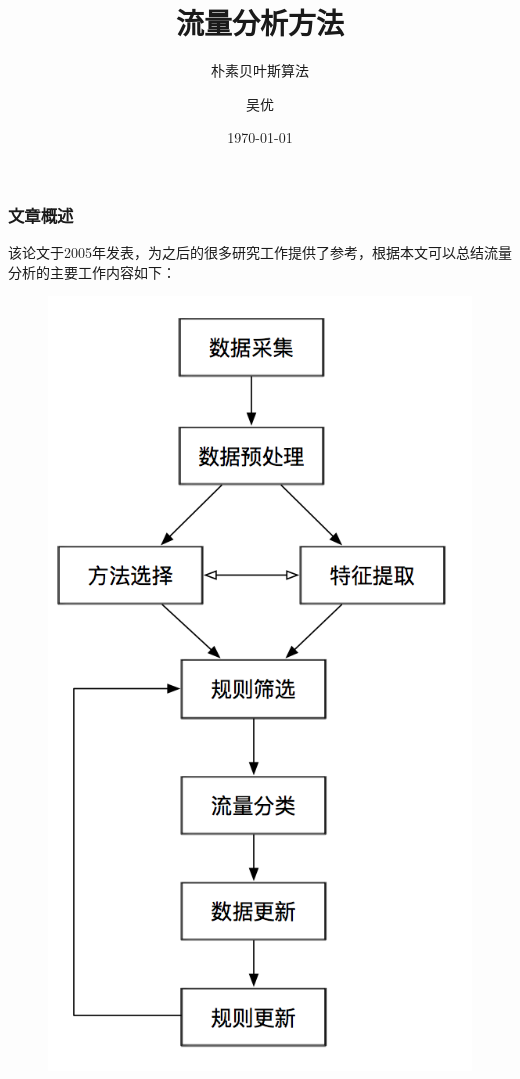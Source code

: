 \documentclass{beamer}
\title{流量分析方法}
\subtitle{朴素贝叶斯算法}
\author{吴优}
\date{\today}
\begin{document}
\maketitle


\begin{frame}
    \frametitle{文章概述}
    该论文于2005年发表，为之后的很多研究工作提供了参考，根据本文可以总结流量分析的主要工作内容如下：
    \begin{figure}
            \includegraphics[scale=0.3]{../../Figures/Procedure_of_Flow_Classification.png}
    \end{figure}
\end{frame}
\end{document}
